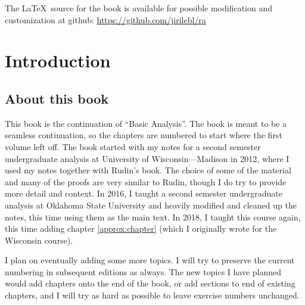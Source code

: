 \documentclass[12pt]{book}
\theoremstyle{plain}
\theoremstyle{remark}
\theoremstyle{definition}
\theoremstyle{exercise}
\theoremstyle{example}
\begin{document}
\bigskip

\noindent
The \LaTeX\ source for the book is available
for possible modification and customization
at github: \url{https://github.com/jirilebl/ra}



\tableofcontents
{}

\newpage


\chapter*{Introduction}


\section*{About this book}

This book is the continuation of ``Basic Analysis''.  The book is meant to
be a seamless continuation, so the chapters are numbered to start where the
first volume left off.  The book started with my notes for a second semester
undergraduate analysis at University of Wisconsin---Madison in 2012, where I
used my notes together with Rudin's book.  The choice of some of the
material and many of the proofs are very similar to Rudin, though I do try
to provide more detail and context.
In 2016, I taught a second
semester undergraduate analysis at Oklahoma State University and heavily
modified and cleaned up the notes, this time using them as the main text.
In 2018, I taught this course again, this time adding chapter
\ref{approx:chapter} (which I originally wrote for the Wisconsin course).

I plan on eventually adding some more topics.
I will try to
preserve the current numbering in subsequent editions as always.  The new
topics I have planned would add chapters onto the end of the
book, or add sections to end of existing chapters, and I will try as hard as
possible to leave exercise numbers unchanged.
\end{document}
